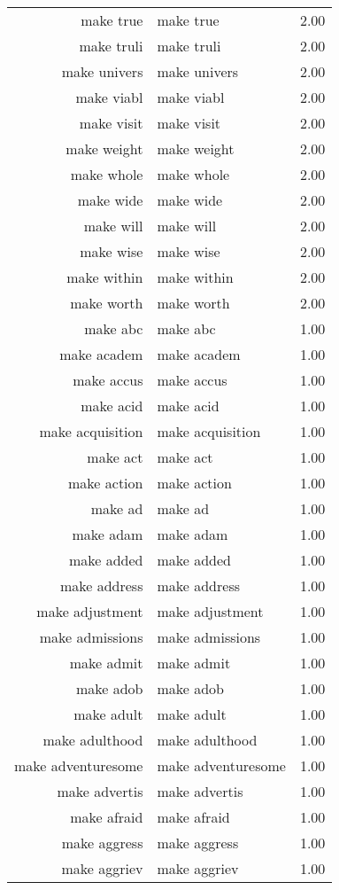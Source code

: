 \begin{table}[ht]
\begin{tabular}{rlr}
  make true & make true & 2.00 \\ 
  make truli & make truli & 2.00 \\ 
  make univers & make univers & 2.00 \\ 
  make viabl & make viabl & 2.00 \\ 
  make visit & make visit & 2.00 \\ 
  make weight & make weight & 2.00 \\ 
  make whole & make whole & 2.00 \\ 
  make wide & make wide & 2.00 \\ 
  make will & make will & 2.00 \\ 
  make wise & make wise & 2.00 \\ 
  make within & make within & 2.00 \\ 
  make worth & make worth & 2.00 \\ 
  make abc & make abc & 1.00 \\ 
  make academ & make academ & 1.00 \\ 
  make accus & make accus & 1.00 \\ 
  make acid & make acid & 1.00 \\ 
  make acquisition & make acquisition & 1.00 \\ 
  make act & make act & 1.00 \\ 
  make action & make action & 1.00 \\ 
  make ad & make ad & 1.00 \\ 
  make adam & make adam & 1.00 \\ 
  make added & make added & 1.00 \\ 
  make address & make address & 1.00 \\ 
  make adjustment & make adjustment & 1.00 \\ 
  make admissions & make admissions & 1.00 \\ 
  make admit & make admit & 1.00 \\ 
  make adob & make adob & 1.00 \\ 
  make adult & make adult & 1.00 \\ 
  make adulthood & make adulthood & 1.00 \\ 
  make adventuresome & make adventuresome & 1.00 \\ 
  make advertis & make advertis & 1.00 \\ 
  make afraid & make afraid & 1.00 \\ 
  make aggress & make aggress & 1.00 \\ 
  make aggriev & make aggriev & 1.00 \\ 

\end{tabular}
\end{table}
